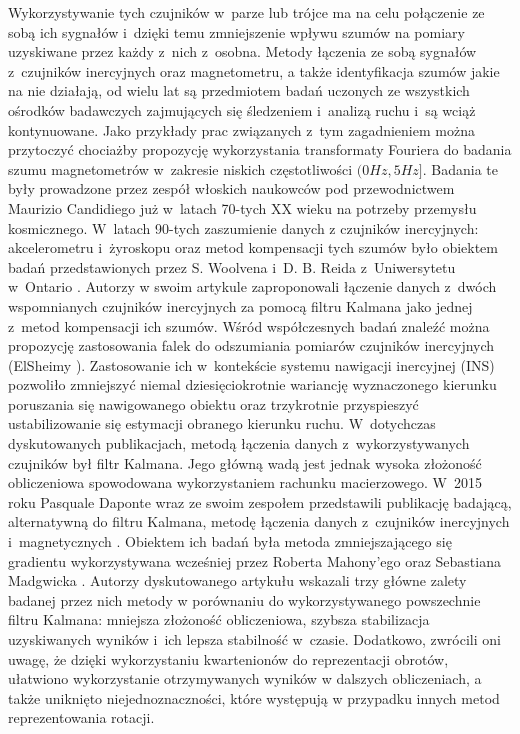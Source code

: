 Wykorzystywanie tych czujników w~parze lub trójce ma na celu połączenie ze sobą ich sygnałów i~dzięki temu zmniejszenie wpływu szumów na pomiary uzyskiwane przez każdy z~nich z~osobna. Metody łączenia ze sobą sygnałów z~czujników inercyjnych oraz magnetometru, a także identyfikacja szumów jakie na nie działają, od wielu lat są przedmiotem badań uczonych ze wszystkich ośrodków badawczych zajmujących się śledzeniem i~analizą ruchu i~są wciąż kontynuowane. Jako przykłady prac związanych z~tym zagadnieniem można przytoczyć chociażby propozycję wykorzystania transformaty Fouriera do badania szumu magnetometrów w~zakresie niskich częstotliwości $(0Hz, 5Hz]$\cite{Candidi1974}. Badania te były prowadzone przez zespół włoskich naukowców pod przewodnictwem Maurizio Candidiego już w~latach 70-tych XX wieku na potrzeby przemysłu kosmicznego. W~latach 90-tych zaszumienie danych z czujników inercyjnych: akcelerometru i~żyroskopu oraz metod kompensacji tych szumów było obiektem badań przedstawionych przez S. Woolvena i~D. B. Reida z~Uniwersytetu w~Ontario \cite{Woolven1994}. Autorzy w swoim artykule zaproponowali łączenie danych z~dwóch wspomnianych czujników inercyjnych za pomocą filtru Kalmana jako jednej z~metod kompensacji ich szumów. Wśród współczesnych badań znaleźć można propozycję zastosowania falek do odszumiania pomiarów czujników inercyjnych (ElSheimy \cite{ElSheimy2004}). Zastosowanie ich w~kontekście systemu nawigacji inercyjnej (INS) pozwoliło zmniejszyć niemal dziesięciokrotnie wariancję wyznaczonego kierunku poruszania się nawigowanego obiektu oraz trzykrotnie przyspieszyć ustabilizowanie się estymacji obranego kierunku ruchu. W~dotychczas dyskutowanych publikacjach, metodą łączenia danych z~wykorzystywanych czujników był filtr Kalmana. Jego główną wadą jest jednak wysoka złożoność obliczeniowa spowodowana wykorzystaniem rachunku macierzowego. W~2015 roku Pasquale Daponte wraz ze swoim zespołem przedstawili publikację badającą, alternatywną do filtru Kalmana, metodę łączenia danych z~czujników inercyjnych i~magnetycznych \cite{Daponte2015}. Obiektem ich badań była metoda zmniejszającego się gradientu wykorzystywana wcześniej przez Roberta Mahony'ego \cite{Mahony2005a} oraz Sebastiana Madgwicka \cite{Madgwick2011}. Autorzy dyskutowanego artykułu wskazali trzy główne zalety badanej przez nich metody w porównaniu do wykorzystywanego powszechnie filtru Kalmana: mniejsza złożoność obliczeniowa, szybsza stabilizacja uzyskiwanych wyników i~ich lepsza stabilność w~czasie. Dodatkowo, zwrócili oni uwagę, że dzięki wykorzystaniu kwartenionów do reprezentacji obrotów, ułatwiono wykorzystanie otrzymywanych wyników w dalszych obliczeniach, a także uniknięto niejednoznaczności, które występują w przypadku innych metod reprezentowania rotacji.

